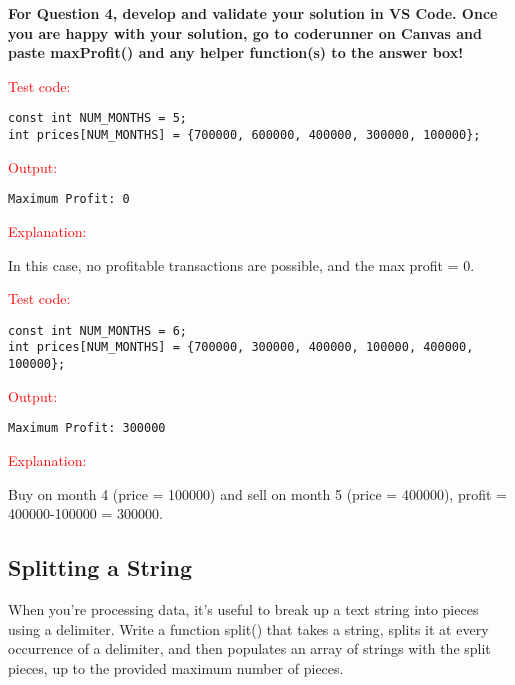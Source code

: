 \textbf{For Question 4, develop and validate your solution in VS Code. Once you are happy with your solution, go to coderunner on Canvas and paste maxProfit() and any helper function(s) to the answer box!}  
\begin{sample}
\textcolor{red}{Test code:}
\begin{verbatim}
const int NUM_MONTHS = 5;
int prices[NUM_MONTHS] = {700000, 600000, 400000, 300000, 100000};
\end{verbatim}
\textcolor{red}{Output:}
\begin{verbatim}
Maximum Profit: 0
\end{verbatim}
\textcolor{red}{Explanation:} 

In this case, no profitable transactions are possible, and the max profit = 0.
\end{sample}


\begin{sample}
\textcolor{red}{Test code:}
\begin{verbatim}
const int NUM_MONTHS = 6;
int prices[NUM_MONTHS] = {700000, 300000, 400000, 100000, 400000, 100000};
\end{verbatim}
\textcolor{red}{Output:}
\begin{verbatim}
Maximum Profit: 300000
\end{verbatim}
\textcolor{red}{Explanation:} 

Buy on month 4 (price = 100000) and sell on month 5 (price = 400000), profit = 400000-100000 = 300000.
\end{sample}



\subsection{Splitting a String}

When you're processing data, it's useful to break up a text string into pieces using a delimiter. Write a function split() that takes a string, splits it at every occurrence of a delimiter, and then populates an array of strings with the split pieces, up to the provided maximum number of pieces.

